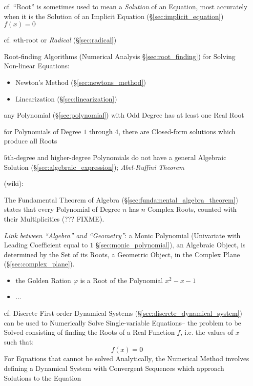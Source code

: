 \fist cf. ``Root'' is sometimes used to mean a \emph{Solution} of an Equation,
most accurately when it is the Solution of an Implicit Equation
(\S\ref{sec:implicit_equation}) $f(x) = 0$

\fist cf. $n$th-root or \emph{Radical} (\S\ref{sec:radical})

\fist Root-finding Algorithms (Numerical Analysis \S\ref{sec:root_finding}) for
Solving Non-linear Equations:
\begin{itemize}
  \item Newton's Method (\S\ref{sec:newtons_method})
  \item Linearization (\S\ref{sec:linearization})
\end{itemize}

any Polynomial (\S\ref{sec:polynomial}) with Odd Degree has at least one Real
Root

for Polynomials of Degree $1$ through $4$, there are Closed-form solutions which
produce all Roots

$5$th-degree and higher-degree Polynomials do not have a general Algebraic
Solution (\S\ref{sec:algebraic_expression}); \emph{Abel-Ruffini Theorem}

(wiki):

The Fundamental Theorem of Algebra (\S\ref{sec:fundamental_algebra_theorem})
states that every Polynomial of Degree $n$ has $n$ Complex Roots, counted with
their Multiplicities (??? FIXME).

\emph{Link between ``Algebra'' and ``Geometry''}: a Monic Polynomial
(Univariate with Leading Coefficient equal to $1$ \S\ref{sec:monic_polynomial}),
an Algebraic Object, is determined by the Set of its Roots, a Geometric Object,
in the Complex Plane (\S\ref{sec:complex_plane}).

\asterism

\begin{itemize}
  \item the Golden Ration $\varphi$ is a Root of the Polynomial $x^2 - x - 1$
  \item ...
\end{itemize}

\asterism

\fist cf. Discrete First-order Dynamical Systems
(\S\ref{sec:discrete_dynamical_system}) can be used to Numerically Solve
Single-variable Equations-- the problem to be Solved consisting of finding the
Roots of a Real Function $f$, i.e. the values of $x$ such that:
\[
  f(x) = 0
\]
For Equations that cannot be solved Analytically, the Numerical Method involves
defining a Dynamical System with Convergent Sequences which approach Solutions
to the Equation



